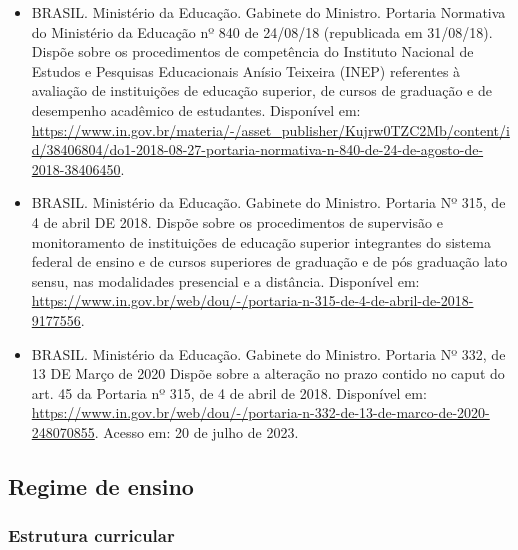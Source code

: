 \begin{itemize}
  \item BRASIL. Ministério da Educação. Gabinete do Ministro. Portaria
    Normativa do Ministério da Educação nº 840 de 24/08/18
    (republicada em 31/08/18). Dispõe sobre os procedimentos de
    competência do Instituto Nacional de Estudos e Pesquisas
    Educacionais Anísio Teixeira (INEP) referentes à avaliação de
    instituições de educação superior, de cursos de graduação e de
    desempenho acadêmico de estudantes. Disponível em:\\
    \href{https://www.in.gov.br/materia/-/asset_publisher/Kujrw0TZC2Mb/content/id/38406804/do1-2018-08-27-portaria-normativa-n-840-de-24-de-agosto-de-2018-38406450}{https://www.in.gov.br/materia/-/asset\_publisher/Kujrw0TZC2Mb/content/id/38406804/do1-2018-08-27-portaria-normativa-n-840-de-24-de-agosto-de-2018-38406450}.
    
  \item BRASIL. Ministério da Educação. Gabinete do Ministro.
    Portaria Nº 315, de 4 de abril DE 2018. Dispõe sobre os
    procedimentos de supervisão e monitoramento de instituições de
    educação superior integrantes do sistema federal de ensino e de
    cursos superiores de graduação e de pós graduação lato sensu, nas
    modalidades presencial e a distância. Disponível em:
    \url{https://www.in.gov.br/web/dou/-/portaria-n-315-de-4-de-abril-de-2018-9177556}.
    
  \item BRASIL. Ministério da Educação. Gabinete do Ministro. Portaria
    Nº 332, de 13 DE Março de 2020 Dispõe sobre a alteração no prazo
    contido no caput do art. 45 da Portaria nº 315, de 4 de abril de
    2018. Disponível em:
    \href{https://www.in.gov.br/web/dou/-/portaria-n-332-de-13-de-marco-de-2020-248070855}{https://www.in.gov.br/web/dou/-/portaria-n-332-de-13-de-marco-de-2020-248070855}.
    Acesso em: 20 de julho de 2023.
\end{itemize}


\subsection{Regime de ensino}

\subsubsection{Estrutura curricular}

